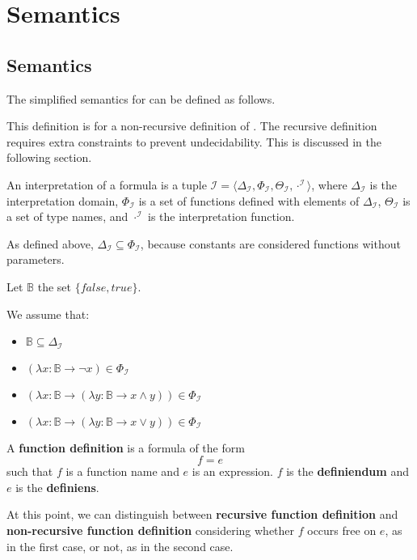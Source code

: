 \chapter{Semantics}


\section{Semantics}

\newcommand{\I}[1]{\ensuremath{{#1}^{\mathcal{I}}}}

\newcommand{\DeltaI}{\ensuremath{\Delta _{\mathcal{I}}}}
\newcommand{\ThetaI}{\ensuremath{\Theta _{\mathcal{I}}}}
\newcommand{\PhiI}{\ensuremath{\Phi _{\mathcal{I}}}}

\newcommand{\lambd}[2]{\ensuremath{(\lambda {#1} \to {#2})}}

The simplified semantics for \Soda can be defined as follows.

This definition is for a non-recursive definition of \Soda.
The recursive definition requires extra constraints to prevent undecidability.
This is discussed in the following section.

An interpretation of a \Soda formula is a tuple $\mathcal{I} = \langle \DeltaI, \PhiI, \ThetaI, \I{\cdot} \rangle$, where $\DeltaI$ is the interpretation domain, $\PhiI$ is a set of functions defined with elements of $\DeltaI$, $\ThetaI$ is a set of type names, and $\I{\cdot}$ is the interpretation function.

As defined above, $\DeltaI \subseteq \PhiI$, because constants are considered functions without parameters.

Let $\mathbb{B}$ the set $\{false, true\}$.

We assume that:
\begin{itemize}
    \item $\mathbb{B} \subseteq \DeltaI$
    \item $\lambd{x: \mathbb{B}}{\lnot x} \in \PhiI$
    \item $\lambd{x: \mathbb{B}}{\lambd{y: \mathbb{B}}{x \land y}} \in \PhiI$
    \item $\lambd{x: \mathbb{B}}{\lambd{y: \mathbb{B}}{x \lor y}} \in \PhiI$
\end{itemize}

A \textbf{function definition} is a formula of the form
\[f = e\]
such that $f$ is a function name and $e$ is an expression.
$f$ is the \textbf{definiendum} and $e$ is the \textbf{definiens}.


At this point, we can distinguish between \textbf{recursive function definition} and \textbf{non-recursive function definition} considering whether $f$ occurs free on $e$,
as in the first case, or not, as in the second case.

